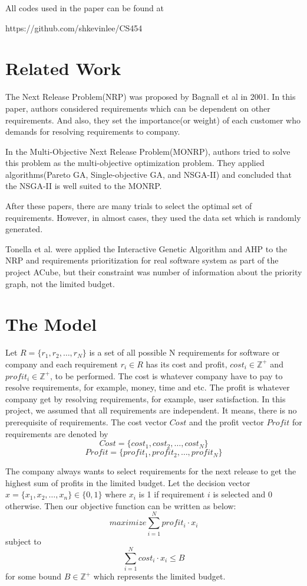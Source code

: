 All codes used in the paper can be found at 

https://github.com/shkevinlee/CS454

\section{Related Work}
The Next Release Problem(NRP)\cite{NRP} was proposed by Bagnall et al in 2001. In this paper, authors considered requirements which can be dependent on other requirements. And also, they set the importance(or weight) of each customer who demands for resolving requirements to company.

In the Multi-Objective Next Release Problem(MONRP)\cite{MONRP}, authors tried to solve this problem as the multi-objective optimization problem. They applied algorithms(Pareto GA, Single-objective GA, and NSGA-II) and concluded that the NSGA-II is well suited to the MONRP.

After these papers, there are many trials to select the optimal set of requirements.\cite{ILP} \cite{DE} \cite{ACO} However, in almost cases, they used the data set which is randomly generated.

Tonella et al. were applied the Interactive Genetic Algorithm and AHP to the NRP and requirements prioritization for real software system as part of the project ACube, but their constraint was number of information about the priority graph, not the limited budget.\cite{IGA} 



\section{The Model}

Let $R = \{r_1, r_2, \ldots, r_N\}$ is a set of all possible N requirements for software or company and each requirement $r_i \in R$ has its cost and profit, $cost_i \in \mathbb{Z}^+$ and $profit_i \in \mathbb{Z}^+$, to be performed. The cost is whatever company have to pay to resolve requirements, for example, money, time and etc. The profit is whatever company get by resolving requirements, for example, user satisfaction. In this project, we assumed that all requirements are independent. It means, there is no prerequisite of requirements. The cost vector $Cost$ and the profit vector $Profit$ for requirements are denoted by 
\[
Cost = \{cost_1, cost_2, \ldots, cost_N\}
\]
\[
Profit = \{profit_1, profit_2, \ldots, profit_N\}
\]

The company always wants to select requirements for the next release to get the highest sum of profits in the limited budget. Let the decision vector $x = \{x_1, x_2, \ldots, x_n\} \in \{0, 1\}$ where $x_i$ is 1 if requirement $i$ is selected and 0 otherwise. Then our objective function can be written as below:
\[
maximize \sum_{i = 1}^{N} profit_i \cdot x_i
\]
subject to
\[
\sum_{i = 1}^{N} cost_i \cdot x_i \leq B
\]
for some bound $B \in \mathbb{Z}^+$ which represents the limited budget.

